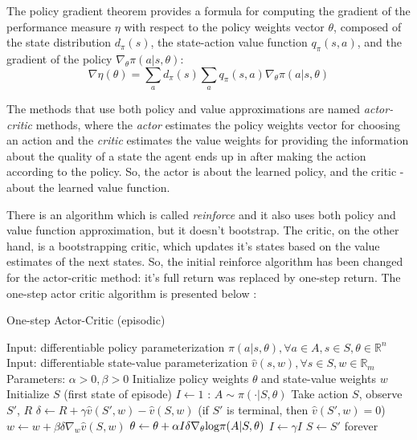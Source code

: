 The policy gradient theorem provides a formula for computing the gradient of the performance measure $\eta$ with respect to the policy weights vector $\theta$, composed of the state distribution $d_{\pi}(s)$, the state-action value function $q_{\pi}(s,a)$, and the gradient of the policy $\nabla_{\theta}\pi(a|s,\theta)$:
\begin{equation}\label{gradMTheorem}
\nabla\eta(\theta)=\sum_{a}d_{\pi}(s)\sum_{a}q_{\pi}(s,a)\nabla_{\theta}\pi(a|s,\theta)
\end{equation}

The methods that use both policy and value approximations are named \textit{actor-critic} methods, where the \textit{actor} estimates the policy weights vector for choosing an action and the \textit{critic} estimates the value weights for providing the information about the quality of a state the agent ends up in after making the action according to the policy. So, the actor is about the learned policy, and the critic - about the learned value function. 

There is an algorithm which is called \textit{reinforce} and it also uses both policy and value function approximation, but it doesn't bootstrap. The critic, on the other hand, is a bootstrapping critic, which updates it's states based on the value estimates of the next states. So, the initial reinforce algorithm has been changed for the actor-critic method: it's full return was replaced by one-step return. The one-step actor critic algorithm is presented below \cite{Sutton}:
\begin{algorithm}[H]
	\caption{One-step Actor-Critic (episodic)}
	\label{algo:AC}
	\begin{algorithmic}
		\State Input: differentiable policy parameterization $\pi(a|s,\theta),\forall a\in A, s\in S,\theta\in\mathbb{R}^{n}$
		\State Input: differentiable state-value parameterization $\hat{v}(s,w),\forall s \in S, w \in \mathbb{R}_{m}$
		\State Parameters: $\alpha>0,\beta>0$
		\State Initialize policy weights $\theta$ and state-value weights $w$
		\Repeat
		\State Initialize $S$ (first state of episode)
		\State $I\leftarrow 1$
		:
		\State $A\sim \pi(\cdot|S,\theta)$
		\State Take action $S$, observe $S'$, $R$
		\State $\delta\leftarrow R+\gamma\hat{v}(S',w)-\hat{v}(S,w)$ (if $S'$ is terminal, then $\hat{v}(S',w)=0$)
		\State $w\leftarrow w+\beta\delta\nabla_{w}\hat{v}(S,w)$
		\State $\theta\leftarrow \theta+\alpha I \delta\nabla_{\theta} \textup{log} \pi(A|S,\theta)$
		\State $I\leftarrow \gamma I$
		\State $S\leftarrow S'$
		\EndWhile
		\Until forever
	\end{algorithmic}
\end{algorithm}

